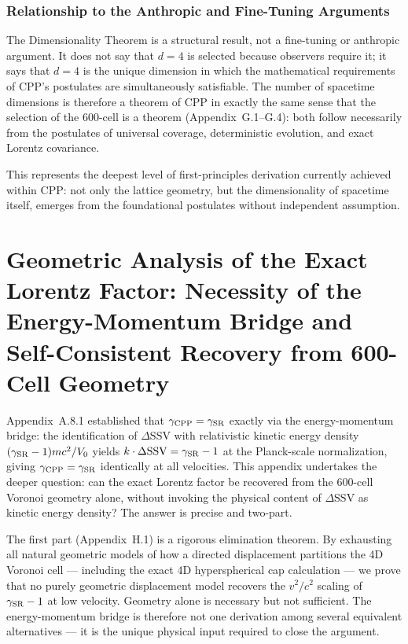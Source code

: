 \documentclass[11pt,letterpaper]{article}
\begin{document}
\subsubsection{Relationship to the Anthropic and Fine-Tuning Arguments}

The Dimensionality Theorem is a structural result, not a 
fine-tuning or anthropic argument. It does not say that $d = 4$ 
is selected because observers require it; it says that $d = 4$ 
is the unique dimension in which the mathematical requirements of 
CPP's postulates are simultaneously satisfiable. The number of 
spacetime dimensions is therefore a theorem of CPP in exactly the 
same sense that the selection of the 600-cell is a theorem 
(Appendix~G.1--G.4): both follow necessarily from the postulates 
of universal coverage, deterministic evolution, and exact Lorentz 
covariance.

This represents the deepest level of first-principles derivation 
currently achieved within CPP: not only the lattice geometry, 
but the dimensionality of spacetime itself, emerges from the 
foundational postulates without independent assumption.


\section{Geometric Analysis of the Exact Lorentz Factor: Necessity of the Energy-Momentum Bridge and Self-Consistent Recovery from 600-Cell Geometry}\label{app:H}

Appendix~A.8.1 established that $\gamma_{\rm CPP} = \gamma_{\rm SR}$ exactly via the energy-momentum bridge: the identification of $\Delta\text{SSV}$ with relativistic kinetic energy density $(\gamma_{\rm SR}-1)mc^2/V_0$ yields $k\cdot\Delta\text{SSV} = \gamma_{\rm SR} - 1$ at the Planck-scale normalization, giving $\gamma_{\rm CPP} = \gamma_{\rm SR}$ identically at all velocities. 
This appendix undertakes the deeper question: can the exact Lorentz factor be recovered from the 600-cell Voronoi geometry alone, without invoking the physical content of $\Delta\text{SSV}$ as kinetic energy density? The answer is precise and two-part.

The first part (Appendix~H.1) is a rigorous elimination theorem. By exhausting all natural geometric models of how a directed displacement partitions the 4D Voronoi cell — including the exact 4D hyperspherical cap calculation — we prove that no purely geometric displacement model recovers the $v^2/c^2$ scaling of $\gamma_{\rm SR} - 1$ at low velocity. Geometry alone is necessary but not sufficient. The energy-momentum bridge is therefore not one derivation among several 
equivalent alternatives — it is the unique physical input required to close the argument.
\end{document}
